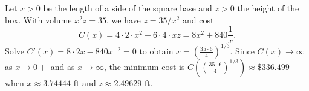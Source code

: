 \begin{enumerate}[1.]
\begin{multicols}{2}
\begin{Solution}
Let \(x>0\) be the length of a side of the square base and \(z>0\) the height of the box. With volume \(x^{2} z=35\), we have \(z=35/x^{2}\) and cost
\[C(x)=4\cdot 2\cdot x^{2}+6\cdot 4\cdot xz=8x^{2}+840\frac{1}{x}.\]
Solve \(C'(x)=8\cdot 2x-840x^{-2}=0\) to obtain \(x= \left(\frac{35 \cdot 6}{4} \right)^{1/3}\). 
Since \(C(x) \to \infty\) as \(x \to 0+\) and as \(x \to \infty\), the minimum cost is 
\(C\left( (\frac{35 \cdot 6}{4})^{1/3} \right)
\approx \$ 336.499\) 
when 
\(x\approx 3.74444\textrm{ ft}\) 
and 
\(z\approx 2.49629\textrm{ ft}\).
\par\end{Solution}
%

\end{multicols}
\end{enumerate}
